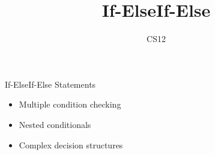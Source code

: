 \documentclass{beamer}
\title{If-ElseIf-Else}
\author{CS12}
\date{}
\begin{document}
\begin{frame}
    \titlepage
\end{frame}

\begin{frame}{If-ElseIf-Else Statements}
    \begin{itemize}
        \item Multiple condition checking
        \item Nested conditionals
        \item Complex decision structures
    \end{itemize}
\end{frame}
\end{document}
